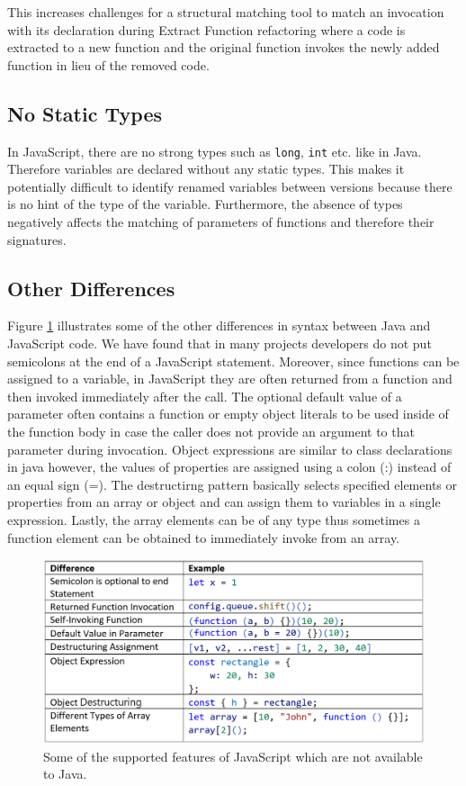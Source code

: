 \documentclass[letterpaper,12pt,onecolumn,final]{report}
\begin{document}
This increases challenges for a structural matching tool to match an invocation with its declaration during Extract Function refactoring where a code is extracted to a new function and the original function invokes the newly added function in lieu of the removed code.


\subsection {No Static Types}

In JavaScript, there are no strong types such as \texttt{long}, \texttt{int} etc. like in Java. Therefore variables are declared without any static types. This makes it potentially difficult to identify renamed variables between versions because there is no hint of the type of the variable. Furthermore, the absence of types negatively affects the matching of parameters of functions and therefore their signatures.

\subsection {Other Differences}

Figure \ref{fig:jsvsjava} illustrates some of the other differences in syntax between Java and JavaScript code. We have found that in many projects developers do not put semicolons at the end of a JavaScript statement. Moreover, since functions can be assigned to a variable, in JavaScript they are often returned from a function and then invoked immediately after the call. The optional default value of a parameter often contains a function or empty object literals to be used inside of the function body in case the caller does not provide an argument to that parameter during invocation. Object expressions are similar to class declarations in java however, the values of properties are assigned using a colon (:) instead of an equal sign (=). The destructirng pattern basically selects specified elements or properties from an array or object and can assign them to variables in a single expression. Lastly, the array elements can be of any type thus sometimes a function element can be obtained to immediately invoke from an array.


\begin{figure}
\includegraphics[width=\textwidth,height=\textheight,keepaspectratio]{images/jsvsjava.PNG}
  \caption{Some of the supported features of JavaScript which are not available to Java.}
   \label{fig:jsvsjava}
\end{figure} 
\end{document}
